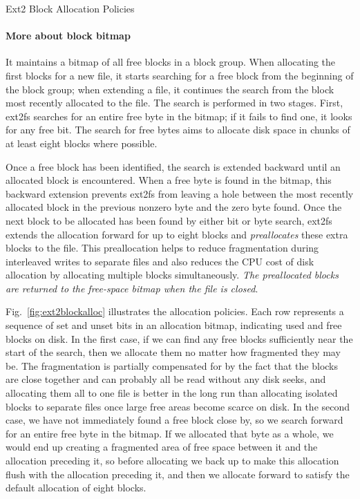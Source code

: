 \begin{frame}{Ext2 Block Allocation Policies}
  \begin{center}\label{fig:ext2blockalloc}
  \end{center}
\end{frame}

\paragraph{More about block bitmap}

It maintains a bitmap of all free blocks in a block group. When allocating the first
blocks for a new file, it starts searching for a free block from the beginning of the
block group; when extending a file, it continues the search from the block most recently
allocated to the file. The search is performed in two stages. First, ext2fs searches for
an entire free byte in the bitmap; if it fails to find one, it looks for any free bit.
The search for free bytes aims to allocate disk space in chunks of at least eight blocks
where possible.

Once a free block has been identified, the search is extended backward until an allocated
block is encountered. When a free byte is found in the bitmap, this backward extension
prevents ext2fs from leaving a hole between the most recently allocated block in the
previous nonzero byte and the zero byte found.  Once the next block to be allocated has
been found by either bit or byte search, ext2fs extends the allocation forward for up to
eight blocks and \emph{preallocates} these extra blocks to the file. This preallocation
helps to reduce fragmentation during interleaved writes to separate files and also reduces
the CPU cost of disk allocation by allocating multiple blocks simultaneously. \emph{The
  preallocated blocks are returned to the free-space bitmap when the file is closed}.

Fig.~\ref{fig:ext2blockalloc} illustrates the allocation policies. Each row represents a
sequence of set and unset bits in an allocation bitmap, indicating used and free blocks on
disk. In the first case, if we can find any free blocks sufficiently near the start of the
search, then we allocate them no matter how fragmented they may be. The fragmentation is
partially compensated for by the fact that the blocks are close together and can probably
all be read without any disk seeks, and allocating them all to one file is better in the
long run than allocating isolated blocks to separate files once large free areas become
scarce on disk. In the second case, we have not immediately found a free block close by,
so we search forward for an entire free byte in the bitmap. If we allocated that byte as a
whole, we would end up creating a fragmented area of free space between it and the
allocation preceding it, so before allocating we back up to make this allocation flush
with the allocation preceding it, and then we allocate forward to satisfy the default
allocation of eight blocks.

